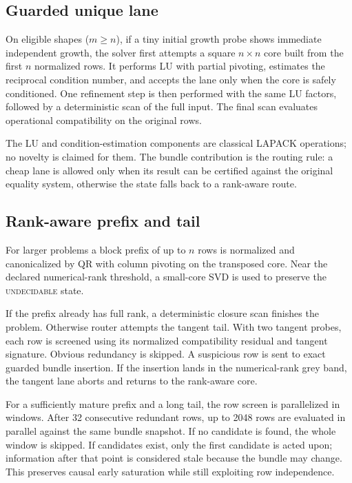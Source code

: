 \documentclass[11pt]{article}
\theoremstyle{definition}
\begin{document}
\subsection{Guarded unique lane}
On eligible shapes ($m\ge n$), if a tiny initial growth probe shows immediate independent growth, the solver first attempts a square \(n\times n\) core built from the first \(n\) normalized rows. It performs LU with partial pivoting, estimates the reciprocal condition number, and accepts the lane only when the core is safely conditioned. One refinement step is then performed with the same LU factors, followed by a deterministic scan of the full input. The final scan evaluates operational compatibility on the original rows.

The LU and condition-estimation components are classical LAPACK operations; no novelty is claimed for them. The bundle contribution is the routing rule: a cheap lane is allowed only when its result can be certified against the original equality system, otherwise the state falls back to a rank-aware route.

\subsection{Rank-aware prefix and tail}
For larger problems a block prefix of up to \(n\) rows is normalized and canonicalized by QR with column pivoting on the transposed core. Near the declared numerical-rank threshold, a small-core SVD is used to preserve the \textsc{undecidable} state.

If the prefix already has full rank, a deterministic closure scan finishes the problem. Otherwise router attempts the tangent tail. With two tangent probes, each row is screened using its normalized compatibility residual and tangent signature. Obvious redundancy is skipped. A suspicious row is sent to exact guarded bundle insertion. If the insertion lands in the numerical-rank grey band, the tangent lane aborts and returns to the rank-aware core.

For a sufficiently mature prefix and a long tail, the row screen is parallelized in windows. After 32 consecutive redundant rows, up to 2048 rows are evaluated in parallel against the same bundle snapshot. If no candidate is found, the whole window is skipped. If candidates exist, only the first candidate is acted upon; information after that point is considered stale because the bundle may change. This preserves causal early saturation while still exploiting row independence.
\end{document}
